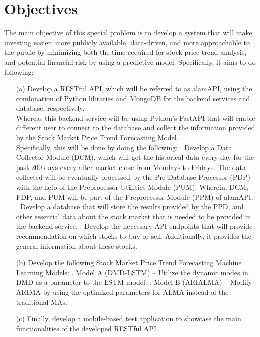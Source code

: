 \section{Objectives}
\label{sec:objectives}
The main objective of this special problem is to develop a 
system that will make investing easier, more publicly available, 
data-driven, and more approachable to the public by minimizing both the 
time required for stock price trend analysis, and potential financial risk 
by using a predictive model. Specifically, it aims to do following:
\begin{itemize}
  \item[(a)] Develop a RESTful API, which will be referred to as alamAPI, 
  using the combination of Python libraries and MongoDB for the backend 
  services and database, respectively.
  \vspace{0.5cm}
  \\Whereas this backend service will be using Python’s 
  FastAPI that will enable different user to connect to 
  the database and collect the information provided by the 
  Stock Market Price Trend Forecasting Model.
  \vspace{0.5cm}
  \\Specifically, this will be done by doing the following:
  .	Develop a Data Collector Module (DCM), 
  which will get the historical data every day for 
  the past 200 days every after market close from Mondays to Fridays. 
  The data collected will be eventually processed by the Pre-Database Processor 
  (PDP) with the help of the Preprocessor Utilities Module (PUM). 
  Wherein, DCM, PDP, and PUM will be part of the Preprocessor Module 
  (PPM) of alamAPI.
  .	Develop a database that will store the results provided by the PPD,
  and other essential data about the stock market that is needed to be provided
  in the backend service.
  .	Develop the necessary API endpoints 
  that will provide recommendation on which stocks to buy or sell. 
  Additionally, it provides the general information about these stocks.
  \item[(b)] Develop the following Stock Market Price Trend Forecasting 
  Machine Learning Models:
    .	Model A (DMD-LSTM) – Utilize the dynamic modes in DMD as a 
    parameter to the LSTM model.
    . Model B (ARIALMA) – Modify ARIMA by using 
    the optimized parameters for ALMA instead of the traditional MAs.
  \item[(c)] Finally, develop a mobile-based test application to showcase 
  the main functionalities of the developed RESTful API.
\end{itemize}